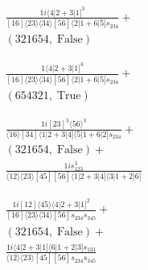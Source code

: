 \documentclass[varwidth, border=5pt]{standalone}
\begin{document}
\begin{my}
$\begin{gathered}
\scriptscriptstyle\frac{1i⟨4|2+3|1]^3}{[16]⟨23⟩⟨34⟩[56]⟨2|1+6|5]s_{234}}+\\
\scriptscriptstyle(321654,\;\text{False})\phantom{+}
\end{gathered}$
\end{my}
\begin{my}
$\begin{gathered}
\scriptscriptstyle\frac{1⟨4|2+3|1]^3}{[16]⟨23⟩⟨34⟩[56]⟨2|1+6|5]s_{234}}+\\
\scriptscriptstyle(654321,\;\text{True})\phantom{+}
\end{gathered}$
\end{my}
\begin{my}
$\begin{gathered}
\scriptscriptstyle\frac{1i[23]^3⟨56⟩^3}{⟨16⟩[34]⟨1|2+3|4]⟨5|1+6|2]s_{234}}+\\
\scriptscriptstyle(321654,\;\text{False})+\\
\scriptscriptstyle\frac{1is_{123}^3}{⟨12⟩⟨23⟩[45][56]⟨1|2+3|4]⟨3|1+2|6]}\phantom{+}
\end{gathered}$
\end{my}
\begin{my}
$\begin{gathered}
\scriptscriptstyle\frac{1i[12]⟨45⟩⟨4|2+3|1]^2}{[16]⟨23⟩⟨34⟩[56]s_{234}s_{345}}+\\
\scriptscriptstyle(321654,\;\text{False})+\\
\scriptscriptstyle\frac{1i⟨4|2+3|1]⟨6|1+2|3]s_{123}}{⟨12⟩⟨23⟩[45][56]s_{234}s_{345}}\phantom{+}
\end{gathered}$
\end{my}
\end{document}

